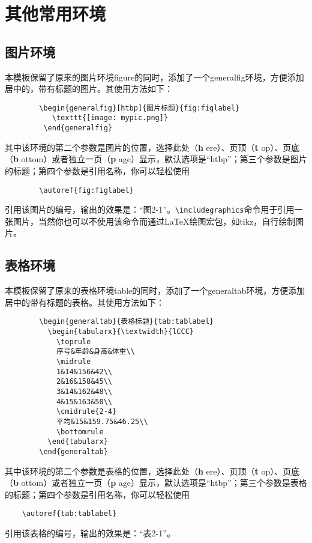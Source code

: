 \documentclass[UTF8]{ctexart}
\begin{document}
	\section{其他常用环境}
	\subsection{图片环境}
	本模板保留了原来的图片环境figure的同时，添加了一个generalfig环境，方便添加居中的，带有标题的图片。其使用方法如下：
	\begin{verbatim}
		\begin{generalfig}[htbp]{图片标题}{fig:figlabel}
		   \texttt{[image: mypic.png]}
		 \end{generalfig}
	\end{verbatim}
	其中该环境的第二个参数是图片的位置，选择此处（{\bfseries h} ere）、页顶（{\bfseries t} op）、页底（{\bfseries b} ottom）或者独立一页（{\bfseries p} age）显示\textsuperscript{\cite[\S 5.3]{9787121202087}}，默认选项是“htbp”；第三个参数是图片的标题；第四个参数是引用名称，你可以轻松使用
	\begin{verbatim}
		\autoref{fig:figlabel}
	\end{verbatim}
	引用该图片的编号，输出的效果是：“图2-1”。\verb|\includegraphics|命令用于引用一张图片，当然你也可以不使用该命令而通过\LaTeX 绘图宏包，如tikz，自行绘制图片。
	
	\subsection{表格环境}
	本模板保留了原来的表格环境table的同时，添加了一个generaltab环境，方便添加居中的带有标题的表格。其使用方法如下：
	\begin{verbatim}
		\begin{generaltab}{表格标题}{tab:tablabel}
		  \begin{tabularx}{\textwidth}{lCCC}
		    \toprule
		    序号&年龄&身高&体重\\
		    \midrule
		    1&14&156&42\\
		    2&16&158&45\\
		    3&14&162&48\\
		    4&15&163&50\\
		    \cmidrule{2-4}
		    平均&15&159.75&46.25\\
		    \bottomrule
		  \end{tabularx}
		\end{generaltab}
	\end{verbatim}
	其中该环境的第二个参数是表格的位置，选择此处（{\bfseries h} ere）、页顶（{\bfseries t} op）、页底（{\bfseries b} ottom）或者独立一页（{\bfseries p} age）显示\cite[\S 5.3]{9787121202087}，默认选项是“htbp”；第三个参数是表格的标题；第四个参数是引用名称，你可以轻松使用
	\begin{verbatim}
	\autoref{tab:tablabel}
	\end{verbatim}
	引用该表格的编号，输出的效果是：“表2-1”。
	
\end{document}
